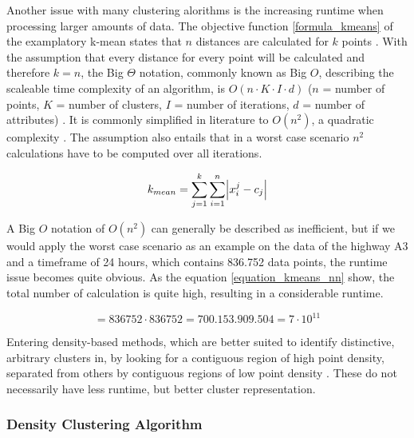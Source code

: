 \documentclass[a4paper,headsepline,footsepline,fontsize=11pt,BCOR=12mm,DIV=12]{report}
\begin{document}
Another issue with many clustering alorithms is the increasing runtime when processing larger amounts of data. The objective function \ref{formula_kmeans} of the examplatory k-mean states that $n$ distances are calculated for $k$ points \cite{Santhanam2010}. With the assumption that every distance for every point will be calculated and therefore $k=n$, the Big $\Theta$ notation, commonly known as Big $O$, describing the scaleable time complexity of an algorithm, is $O(n \cdot K \cdot I \cdot d)$ ($n$ = number of points, $K$ = number of clusters, $I$ = number of iterations, $d$ = number of attributes) \cite{Dalatu2016}. It is commonly simplified in literature to $O(n^2)$, a quadratic complexity \cite{Pakhira2014}. The assumption also entails that in a worst case scenario $n^2$ calculations have to be computed over all iterations.

\begin{equation}
\label{formula_kmeans}
	k_{mean} =  \sum_{j=1}^k{\sum_{i=1}^n{\abs{x_i^j-c_j}}}
\end{equation}

\bigskip

A Big $O$ notation of $O(n^2)$ can generally be described as inefficient, but if we would apply the worst case scenario as an example on the data of the highway A3 and a timeframe of 24 hours, which contains 836.752 data points, the runtime issue becomes quite obvious. As the equation \ref{equation_kmeans_nn} show, the total number of calculation is quite high, resulting in a considerable runtime. \cite{Busch2004}

\begin{equation}
\label{equation_kmeans_nn}
	 = 836752 \cdot 836752 = 700.153.909.504 = 7 \cdot 10^{11}
\end{equation}

\bigskip

Entering density-based methods, which are better suited to identify distinctive, arbitrary clusters in, by looking for a contiguous region of high point density, separated from others by contiguous regions of low point density \cite{Chauhan2020}. These do not necessarily have less runtime, but better cluster representation.

\subsubsection{Density Clustering Algorithm}
\end{document}

